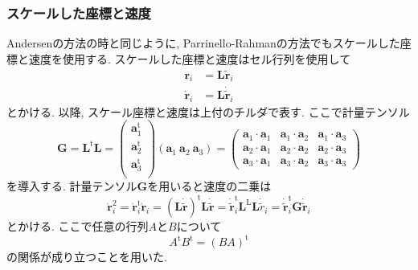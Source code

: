 \subsubsection{スケールした座標と速度}
Andersenの方法の時と同じように, Parrinello-Rahmanの方法でもスケールした座標と速度を使用する. スケールした座標と速度はセル行列を使用して
\begin{align}
  \bm{r}_{i}       &= \bm{L} \tilde{\bm{r}}_{i} \\
  \dot{\bm{r}}_{i} &= \bm{L} \dot{\tilde{\bm{r}}}_{i}
\end{align}
とかける. 以降, スケール座標と速度は上付のチルダ$\tilde{}$で表す.
ここで計量テンソル
\begin{equation}
  \bm{G}
  =
  \bm{L}^{\mathrm{t}} \bm{L}
  =
  \left(
       \begin{array}{c}
        \bm{a}_{1}^{\mathrm{t}}  \\
        \bm{a}_{2}^{\mathrm{t}}  \\
        \bm{a}_{3}^{\mathrm{t}}  \\
       \end{array}
  \right)
  \left(\bm{a}_{1}~ \bm{a}_{2}~ \bm{a}_{3}\right)
  =
  \left(
       \begin{array}{ccc}
          \bm{a}_{1}\cdot\bm{a}_{1}
        & \bm{a}_{1}\cdot\bm{a}_{2}
        & \bm{a}_{1}\cdot\bm{a}_{3} \\
          \bm{a}_{2}\cdot\bm{a}_{1}
        & \bm{a}_{2}\cdot\bm{a}_{2}
        & \bm{a}_{2}\cdot\bm{a}_{3} \\
          \bm{a}_{3}\cdot\bm{a}_{1}
        & \bm{a}_{3}\cdot\bm{a}_{2}
        & \bm{a}_{3}\cdot\bm{a}_{3}
       \end{array}
  \right)
\end{equation}
を導入する.
計量テンソル$\bm{G}$を用いると速度の二乗は
\begin{equation}
  \dot{\bm{r}}_{i}^{2}
  =
  \dot{\bm{r}}_{i}^{\mathrm{t}} \dot{\bm{r}}_{i}
  =
  \left(\bm{L} \dot{\tilde{\bm{r}}} \right)^{\mathrm{t}} \bm{L} \dot{\tilde{\bm{r}}}
  =
  \dot{\tilde{\bm{r}}}_{i}^{\mathrm{t}} \bm{L}^{\mathrm{L}} \bm{L} \dot{\tilde{r}}_{i}
  =
  \dot{\tilde{\bm{r}}}_{i}^{\mathrm{t}} \bm{G} \dot{\tilde{\bm{r}}}_{i}
\end{equation}
とかける. ここで任意の行列$A$と$B$について
\begin{equation}
  A^{\mathrm{t}} B^{\mathrm{t}} = (BA)^{\mathrm{t}}
\end{equation}
の関係が成り立つことを用いた. 


